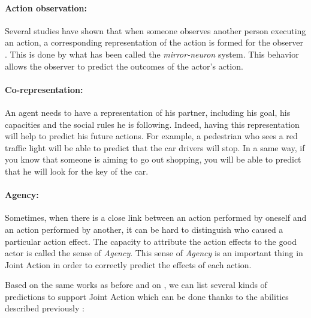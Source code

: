 \documentclass[english,a4paper,11pt,twoside]{StyleThese}
\begin{document}
\paragraph{Action observation:} Several studies have shown that when someone observes another person executing an action, a corresponding representation of the action is formed for the observer \cite{rizzolatti2004mirror}. This is done by what has been called the \textit{mirror-neuron} system. This behavior allows the observer to predict the outcomes of the actor's action. 

\paragraph{Co-representation:} An agent needs to have a representation of his partner, including his goal, his capacities and the social rules he is following. Indeed, having this representation will help to predict his future actions. For example, a pedestrian who sees a red traffic light will be able to predict that the car drivers will stop. In a same way, if you know that someone is aiming to go out shopping, you will be able to predict that he will look for the key of the car.


\paragraph{Agency:} Sometimes, when there is a close link between an action performed by oneself and an action performed by another, it can be hard to distinguish who caused a particular action effect. The capacity to attribute the action effects to the good actor is called the sense of \textit{Agency}. This sense of \textit{Agency} is an important thing in Joint Action in order to correctly predict the effects of each action.

\bigskip
Based on the same works as before and on \cite{sebanz2009prediction}, we can list several kinds of predictions to support Joint Action which can be done thanks to the abilities described previously :
\end{document}
